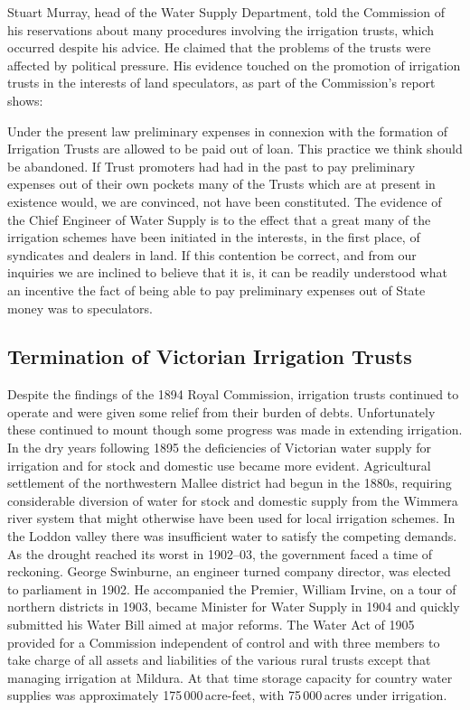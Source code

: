 Stuart Murray, head of the Water Supply Department,
told the Commission of his reservations about many procedures
involving the irrigation trusts, which occurred despite his advice.
He claimed that the problems of the trusts were affected by political
pressure.  His evidence touched on the promotion of irrigation trusts
in the interests of land speculators, as part of the Commission's
report shows:
\begin{Quote}
	Under the present law preliminary expenses in connexion with
	the formation of Irrigation Trusts are allowed to be paid out
	of loan.  This practice we think should be abandoned.  If
	Trust promoters had had in the past to pay preliminary
	expenses out of their own pockets many of the Trusts which are
	at present in existence would, we are convinced, not have been
	constituted.  The evidence of the Chief Engineer of Water
	Supply is to the effect that a great many of the irrigation
	schemes have been initiated in the interests, in the first
	place, of syndicates and dealers in land.  If this contention
	be correct, and from our inquiries we are inclined to believe
	that it is, it can be readily understood what an incentive the
	fact of being able to pay preliminary expenses out of State
	money was to speculators.
\end{Quote}

\subsection*{Termination of Victorian Irrigation Trusts}

Despite the findings of the 1894 Royal Commission, irrigation trusts
continued to operate and were given some relief from their burden of
debts.  Unfortunately these continued to mount though some progress
was made in extending irrigation.  In the dry years following 1895 the
deficiencies of Victorian water supply for irrigation and for stock
and domestic use became more evident.  Agricultural settlement of the
northwestern Mallee  district had begun in the
1880s, requiring considerable diversion of water for stock and
domestic supply from the Wimmera river system
that might otherwise have been used for local irrigation schemes.  In
the Loddon valley there was insufficient water to satisfy the
competing demands.  As the drought reached its worst in
1902--03, the government faced a time of reckoning.  George Swinburne,
 an engineer turned company director, was elected
to parliament in 1902.  He accompanied the Premier, William Irvine,
 on a tour of northern districts in 1903, became
Minister for Water Supply in 1904 and quickly submitted his Water Bill
aimed at major reforms.  The Water Act  of 1905 provided for a Commission independent of control and
with three members to take charge of all assets and liabilities of the
various rural trusts except that managing irrigation at Mildura.  At
that time storage capacity for country water supplies was
approximately 175\,000\,acre-feet, with 75\,000\,acres under
irrigation.

